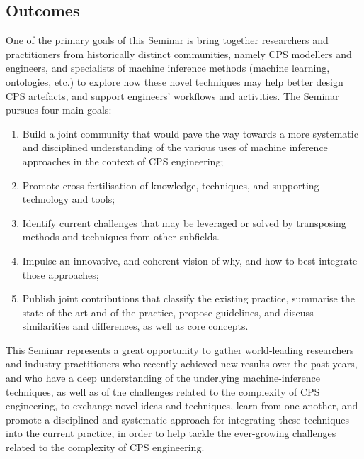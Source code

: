 \subsection{Outcomes}
\label{sec:Outcome}


One of the primary goals of this Seminar is bring together researchers and 
practitioners from historically distinct communities, namely CPS
modellers and engineers, and specialists of machine inference methods (machine 
learning, ontologies, etc.) to explore how these novel techniques may help better
design CPS artefacts, and support engineers' workflows and activities.
%
The Seminar pursues four main goals:
\begin{enumerate}
	\item Build a joint community that would pave the way towards a more systematic
	and disciplined understanding of the various uses of machine inference approaches
	in the context of CPS engineering;
	
	\item Promote cross-fertilisation of knowledge, techniques, and supporting 
	technology and tools;
	
	\item Identify current challenges that may be leveraged or solved by 
	transposing methods and techniques from other subfields.
	
	\item Impulse an innovative, and coherent vision of why, and how to best integrate
	those approaches;
	
	\item Publish joint contributions that classify the existing practice,
	summarise the state-of-the-art and of-the-practice, propose guidelines, and 
	discuss similarities and differences, as well as core concepts.
\end{enumerate}
This Seminar represents a great opportunity to gather world-leading researchers
and industry practitioners who recently achieved new results over the past years,
and who have a deep understanding of the underlying machine-inference techniques, 
as well as of the challenges related to the complexity of CPS engineering, to
exchange novel ideas and techniques, learn from one another, and promote a 
disciplined and systematic approach for integrating these techniques into the
current practice, in order to help tackle the ever-growing challenges related
to the complexity of CPS engineering.